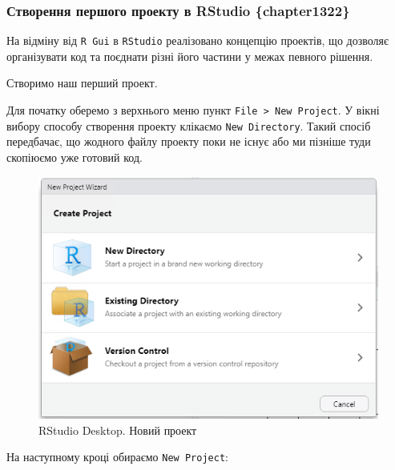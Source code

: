 \documentclass[
]{book}
\begin{document}
\hypertarget{ux441ux442ux432ux43eux440ux435ux43dux43dux44f-ux43fux435ux440ux448ux43eux433ux43e-ux43fux440ux43eux435ux43aux442ux443-ux432-rstudio-chapter1322}{%
\subsubsection{Створення першого проекту в RStudio \{chapter1322\}}\label{ux441ux442ux432ux43eux440ux435ux43dux43dux44f-ux43fux435ux440ux448ux43eux433ux43e-ux43fux440ux43eux435ux43aux442ux443-ux432-rstudio-chapter1322}}

На відміну від \texttt{R\ Gui} в \texttt{RStudio} реалізовано концепцію проектів, що дозволяє організувати код та поєднати різні його частини у межах певного рішення.

Створимо наш перший проект.

Для початку оберемо з верхнього меню пункт \texttt{File\ \textgreater{}\ New\ Project}. У вікні вибору способу створення проекту клікаємо \texttt{New\ Directory}. Такий спосіб передбачає, що жодного файлу проекту поки не існує або ми пізніше туди скопіюємо уже готовий код.

\begin{figure}
\centering
\includegraphics{images/chapter1/rstudio_6.png}
\caption{\label{fig:unnamed-chunk-17}RStudio Desktop. Новий проект}
\end{figure}

На наступному кроці обираємо \texttt{New\ Project}:
\end{document}
